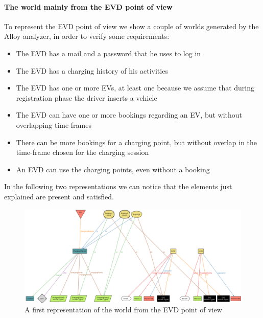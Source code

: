 \paragraph{The world mainly from the EVD point of view}
To represent the EVD point of view we show a couple of worlds generated by the Alloy analyzer, in order to verify some requirements: 
\begin{itemize}
    \item The EVD has a mail and a password that he uses to log in
    \item The EVD has a charging history of his activities
    \item The EVD has one or more EVs, at least one because we assume that during registration phase the driver inserts a vehicle
    \item The EVD can have one or more bookings regarding an EV, but without overlapping time-frames
    \item There can be more bookings for a charging point, but without overlap in the time-frame chosen for the charging session
    \item An EVD can use the charging points, even without a booking
\end{itemize}

In the following two representations we can notice that the elements just explained are present and satisfied.
\begin{figure}[H]
    \centering
    \includegraphics[width=1\textwidth]{Images/cp4/EVDWorldBooking.png}
    \caption{A first representation of the world from the EVD point of view}
\end{figure}

